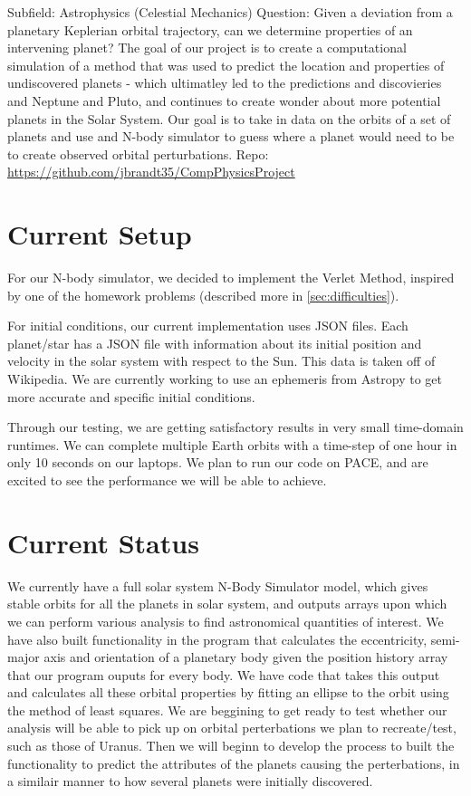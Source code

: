 \documentclass[a4paper,12pt]{article} %
\numberwithin{equation}{section} %
\numberwithin{figure}{section} %
\begin{document}
Subfield: Astrophysics (Celestial Mechanics) \newline
Question: Given a deviation from a planetary Keplerian orbital trajectory, can we determine properties of an intervening planet? \newline
The goal of our project is to create a computational simulation of a method that was used to predict the location and properties of undiscovered planets - which ultimatley led to the predictions and discovieries and Neptune and Pluto, and continues to create wonder about more potential planets in the Solar System. Our goal is to take in data on the orbits of a set of planets and use and N-body simulator to guess where a planet would need to be to create observed orbital perturbations. \newline
Repo: \url{https://github.com/jbrandt35/CompPhysicsProject}

\section{Current Setup}

For our N-body simulator, we decided to implement the Verlet Method, inspired by one of the homework problems (described more in \ref{sec:difficulties}). \par
For initial conditions, our current implementation uses JSON files. Each planet/star has a JSON file with information about its initial position and velocity in the solar system with respect to the Sun. This data is taken off of Wikipedia. We are currently working to use an ephemeris from Astropy to get more accurate and specific initial conditions. \par
Through our testing, we are getting satisfactory results in very small time-domain runtimes. We can complete multiple Earth orbits with a time-step of one hour in only 10 seconds on our laptops. We plan to run our code on PACE, and are excited to see the performance we will be able to achieve.



\section{Current Status}
We currently have a full solar system N-Body Simulator model, which gives stable orbits for all the planets in solar system, and outputs arrays upon which we can perform various analysis to find astronomical quantities of interest. We have also built functionality in the program that calculates the eccentricity, semi-major axis and orientation of a planetary body given the position history array that our program ouputs for every body. We have code that takes this output and calculates all these orbital properties by fitting an ellipse to the orbit using the method of least squares. We are beggining to get ready to test whether our analysis will be able to pick up on orbital perterbations we plan to recreate/test, such as those of Uranus. Then we will beginn to develop the process to built the functionality to predict the attributes of the planets causing the perterbations, in a similair manner to how several planets were initially discovered.
\end{document}
